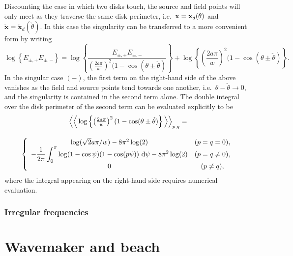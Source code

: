 \documentclass[12pt,a4paper]{article}
\newcommand{\wrt}{ ~ {\rm d}}
\newcommand{\ds}{\displaystyle}
\newcommand{\ie}{i.e.\ }
\newcommand{\rad}{a}
\newcommand{\bx}{{\bf x}}
\newcommand{\bxo}{\check{\textbf{x}}}
\newcommand{\tho}{\check{\theta}}
\begin{document}
Discounting the case in which two disks touch, the source and field points will only meet as they traverse the same disk perimeter, \ie $\bx=\bx_{d}(\theta)$ and $\bxo=\bxo_{d}(\tho)$.
In this case the singularity can be transferred to a more convenient form by writing
\begin{equation}\nonumber
\log\left\{
E_{\pm,+}
E_{\pm,-}
\right\}
=
\log\left\{
\frac{E_{\pm,+}
E_{\pm,-}}{
\left(\frac{2\rad\pi}{w} \right)^2(1-\cos(\theta\pm \tho)
}
\right\}
+
\log\left\{
\left(
\frac{2\rad\pi}{w} 
\right)^2(1-\cos(\theta\pm \tho)
\right\}
.
\end{equation}
In the singular case $(-)$, the first term on the right-hand side of the above vanishes as the field and source points tend towards one another, \ie $\theta-\tho\to 0$, and the singularity is contained in the second term alone.
The double integral over the disk perimeter of the second term can be evaluated explicitly to be
\begin{equation}
\begin{array}{c}
\Big\langle\Big\langle
\log\left\{
\left(
\frac{2\rad\pi}{w} 
\right)^2(1-\cos(\theta\pm \tho)
\right\}
\Big\rangle\Big\rangle_{p,q}
=
\\[18pt]
\left\{
\begin{array}{c c}
\log(\sqrt{2}\rad\pi/w)
-
8\pi^{2}\log(2)
&
(p=q=0),
\\
\ds
-
\frac{1}{2\pi}
\int_{0}^{\pi}
\log(1-\cos\psi)
(1-\cos(p\psi))
\wrt\psi
-
8\pi^{2}\log(2)
&
(p=q\neq 0),
\\
0 & (p\neq q),
\end{array}
\right.
\end{array}
\end{equation}
where the integral appearing on the right-hand side requires numerical evaluation.





%

\subsubsection{Irregular frequencies}



\section{Wavemaker and beach}
\end{document}
